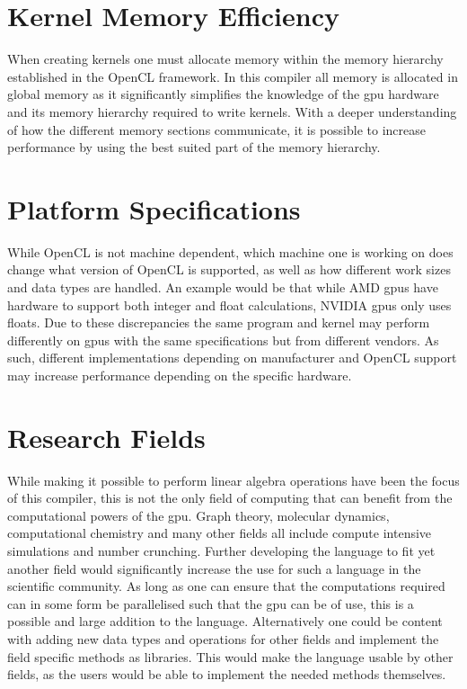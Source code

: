\section{Kernel Memory Efficiency}
When creating kernels one must allocate memory within the memory hierarchy established in the OpenCL framework.
In this compiler all memory is allocated in global memory as it significantly simplifies the knowledge of the \acrshort{gpu} hardware and its memory hierarchy required to write kernels.
With a deeper understanding of how the different memory sections communicate, it is possible to increase performance by using the best suited part of the memory hierarchy. \citep{ocl_lecture3}

\section{Platform Specifications}
While OpenCL is not machine dependent, which machine one is working on does change what version of OpenCL is supported, as well as how different work sizes and data types are handled.
An example would be that while AMD \acrshort{gpu}s have hardware to support both integer and float calculations, NVIDIA \acrshort{gpu}s only uses floats. \citep{CUDAOpenCLOptimisation}
Due to these discrepancies the same program and kernel may perform differently on \acrshort{gpu}s with the same specifications but from different vendors.
As such, different implementations depending on manufacturer and OpenCL support may increase performance depending on the specific hardware.

\section{Research Fields}
While making it possible to perform linear algebra operations have been the focus of this compiler, this is not the only field of computing that can benefit from the computational powers of the \acrshort{gpu}.
Graph theory, molecular dynamics, computational chemistry and many other fields all include compute intensive simulations and number crunching.
Further developing the language to fit yet another field would significantly increase the use for such a language in the scientific community.
As long as one can ensure that the computations required can in some form be parallelised such that the \acrshort{gpu} can be of use, this is a possible and large addition to the language.
Alternatively one could be content with adding new data types and operations for other fields and implement the field specific methods as libraries.
This would make the language usable by other fields, as the users would be able to implement the needed methods themselves.


